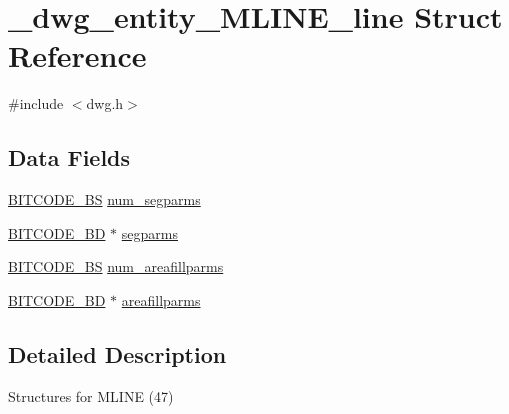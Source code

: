\hypertarget{struct__dwg__entity__MLINE__line}{\section{\-\_\-dwg\-\_\-entity\-\_\-\-M\-L\-I\-N\-E\-\_\-line \-Struct \-Reference}
\label{struct__dwg__entity__MLINE__line}
}


{\ttfamily \#include $<$dwg.\-h$>$}

\subsection*{\-Data \-Fields}
\begin{DoxyCompactItemize}
\item 
\hyperlink{dwg_8h_a94297606fbd4a4ff97e8add284af0809}{\-B\-I\-T\-C\-O\-D\-E\-\_\-\-B\-S} \hyperlink{struct__dwg__entity__MLINE__line_aa6f8789598ea4c89b3abd268c3dcb2ab}{num\-\_\-segparms}
\item 
\hyperlink{dwg_8h_a3c1e6781466b74ba07785d57da70ed97}{\-B\-I\-T\-C\-O\-D\-E\-\_\-\-B\-D} $\ast$ \hyperlink{struct__dwg__entity__MLINE__line_a56576bdca0ad070040055ed2e0daf582}{segparms}
\item 
\hyperlink{dwg_8h_a94297606fbd4a4ff97e8add284af0809}{\-B\-I\-T\-C\-O\-D\-E\-\_\-\-B\-S} \hyperlink{struct__dwg__entity__MLINE__line_a3ad6e963fe45671d9cfb69cf11a41ba8}{num\-\_\-areafillparms}
\item 
\hyperlink{dwg_8h_a3c1e6781466b74ba07785d57da70ed97}{\-B\-I\-T\-C\-O\-D\-E\-\_\-\-B\-D} $\ast$ \hyperlink{struct__dwg__entity__MLINE__line_adbca09d0542723d3f87eac30ad569d8e}{areafillparms}
\end{DoxyCompactItemize}


\subsection{\-Detailed \-Description}
\-Structures for \-M\-L\-I\-N\-E (47) 

